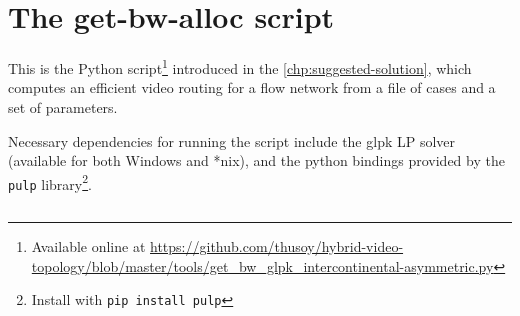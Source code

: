 \chapter{The get-bw-alloc script}
\label{chp:get-bw-alloc}

This is the Python script\footnote{Available online at \url{https://github.com/thusoy/hybrid-video-topology/blob/master/tools/get_bw_glpk_intercontinental-asymmetric.py}} introduced in the \autoref{chp:suggested-solution}, which computes an efficient video routing for a flow network from a file of cases and a set of parameters.

Necessary dependencies for running the script include the glpk LP solver (available for both Windows and *nix), and the python bindings provided by the \texttt{pulp} library\footnote{Install with \texttt{pip install pulp}}.

\inputminted[linenos,
               numbersep=5pt,
               frame=lines,
               framesep=2mm]{python}{tools/get_bw_glpk_intercontinental-asymmetric.py}
